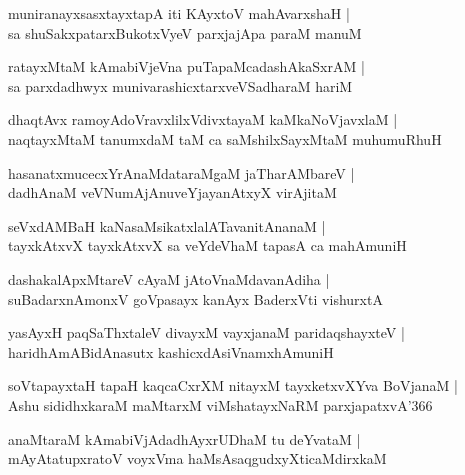 \documentclass[twoside,12pt,openright]{book}
\newcounter{shloka}[chapter]
\begin{document}
\begin{shloka}%
muniranayxsasxtayxtapA iti KAyxtoV mahAvarxshaH |\\
sa shuSakxpatarxBukotxVyeV parxjajApa paraM manuM 
\end{shloka}

\begin{shloka}%
ratayxMtaM kAmabiVjeVna puTapaMcadashAkaSxrAM |\\
sa parxdadhwyx munivarashicxtarxveVSadharaM hariM 
\end{shloka}

\begin{shloka}%
dhaqtAvx ramoyAdoVravxlilxVdivxtayaM kaMkaNoVjavxlaM |\\
naqtayxMtaM tanumxdaM taM ca saMshilxSayxMtaM muhumuRhuH 
\end{shloka}

\begin{shloka}%
hasanatxmucecxYrAnaMdataraMgaM jaTharAMbareV |\\
dadhAnaM veVNumAjAnuveYjayanAtxyX virAjitaM 
\end{shloka}

\begin{shloka}%
seVxdAMBaH kaNasaMsikatxlalATavanitAnanaM |\\
tayxkAtxvX tayxkAtxvX sa veYdeVhaM tapasA ca mahAmuniH
\end{shloka}

\begin{shloka}%
dashakalApxMtareV cAyaM jAtoVnaMdavanAdiha |\\
suBadarxnAmonxV goVpasayx kanAyx BaderxVti vishurxtA 
\end{shloka}

\begin{shloka}%
yasAyxH paqSaThxtaleV divayxM vayxjanaM paridaqshayxteV |\\
haridhAmABidAnasutx kashicxdAsiVnamxhAmuniH 
\end{shloka}

\begin{shloka}%
soVtapayxtaH tapaH kaqcaCxrXM nitayxM tayxketxvXYva BoVjanaM |\\
Ashu sididhxkaraM maMtarxM viMshatayxNaRM parxjapatxvA\char'366
\end{shloka}

\begin{shloka}%
anaMtaraM kAmabiVjAdadhAyxrUDhaM tu deYvataM |\\
mAyAtatupxratoV voyxVma haMsAsaqgudxyXticaMdirxkaM 
\end{shloka}
\end{document}
